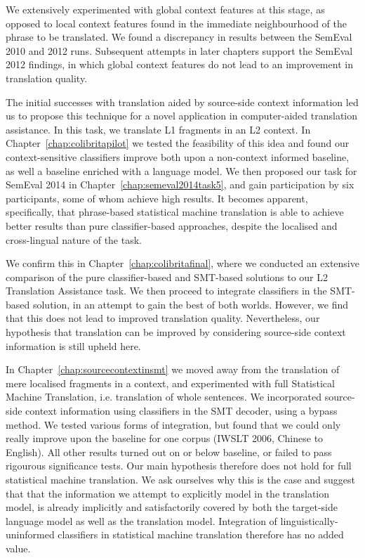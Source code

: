 We extensively experimented with global context features at this stage, as
opposed to local context features found in the immediate neighbourhood of the
phrase to be translated. We found a discrepancy in results between the SemEval
2010 and 2012 runs. Subsequent attempts in later chapters support the SemEval
2012 findings, in which global context features do not lead to an improvement
in translation quality.

The initial successes with translation aided by source-side context information
led us to propose this technique for a novel application in computer-aided translation
assistance. In this task, we translate L1 fragments in an L2 context.
In Chapter~\ref{chap:colibritapilot} we tested the feasibility of this idea and
found our context-sensitive classifiers improve both upon a non-context informed
baseline, as well a baseline enriched with a language model. We then
proposed our task for SemEval 2014 in Chapter~\ref{chap:semeval2014task5}, and gain
participation by six participants, some of whom achieve high results. It
becomes apparent, specifically, that phrase-based statistical machine translation is able to
achieve better results than pure classifier-based approaches, despite the
localised and cross-lingual nature of the task.

We confirm this in Chapter~\ref{chap:colibritafinal}, where we conducted an
extensive comparison of the pure classifier-based and SMT-based solutions to
our L2 Translation Assistance task. We then proceed to integrate classifiers in
the SMT-based solution, in an attempt to gain the best of both worlds. However,
we find that this does not lead to improved translation quality. Nevertheless,
our hypothesis that translation can be improved by considering source-side
context information is still upheld here.

In Chapter~\ref{chap:sourcecontextinsmt} we moved away from the translation of
mere localised fragments in a context, and experimented with full Statistical
Machine Translation, i.e. translation of whole sentences. We incorporated
source-side context information using classifiers in the SMT decoder, using a
bypass method. We tested various forms of integration, but found that we could
only really improve upon the baseline for one corpus (IWSLT 2006, Chinese to
English). All other results turned out on or below baseline, or failed to pass
rigourous significance tests. Our main hypothesis therefore does not hold for
full statistical machine translation. We ask ourselves why this is the case and
suggest that that the information we attempt to explicitly model in the
translation model, is already implicitly and satisfactorily covered by both the
target-side language model as well as the translation model. Integration of
linguistically-uninformed classifiers in statistical machine translation
therefore has no added value.

